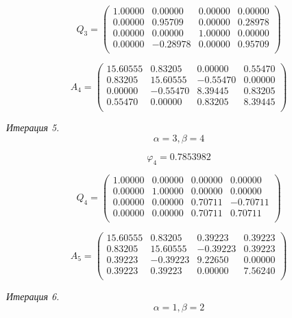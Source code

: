 \documentclass[14pt,a4paper]{scrartcl}
\begin{document}
$$ Q_3 =
\begin{pmatrix}
1.00000 & 0.00000 & 0.00000 & 0.00000 \\ 
0.00000 & 0.95709 & 0.00000 & 0.28978 \\ 
0.00000 & 0.00000 & 1.00000 & 0.00000 \\ 
0.00000 & -0.28978 & 0.00000 & 0.95709 \\ 
\end{pmatrix}
$$

$$
A_4 = 
\begin{pmatrix}
15.60555 & 0.83205 & 0.00000 & 0.55470 \\ 
0.83205 & 15.60555 & -0.55470 & 0.00000 \\ 
0.00000 & -0.55470 & 8.39445 & 0.83205 \\ 
0.55470 & 0.00000 & 0.83205 & 8.39445 \\  
\end{pmatrix}
$$




\textit{Итерация 5.}\\
$$\alpha = 3, \beta = 4$$

$$\varphi_4 = 0.7853982 $$

$$ Q_4 =
\begin{pmatrix}
1.00000 & 0.00000 & 0.00000 & 0.00000 \\ 
0.00000 & 1.00000 & 0.00000 & 0.00000 \\ 
0.00000 & 0.00000 & 0.70711 & -0.70711 \\ 
0.00000 & 0.00000 & 0.70711 & 0.70711 \\ 
\end{pmatrix}
$$

$$
A_5 = 
\begin{pmatrix}
15.60555 & 0.83205 & 0.39223 & 0.39223 \\ 
0.83205 & 15.60555 & -0.39223 & 0.39223 \\ 
0.39223 & -0.39223 & 9.22650 & 0.00000 \\ 
0.39223 & 0.39223 & 0.00000 & 7.56240 \\ 
\end{pmatrix}
$$




\textit{Итерация 6.}\\
$$\alpha = 1, \beta = 2$$
\end{document}
